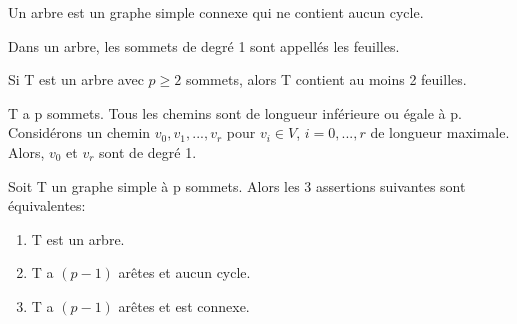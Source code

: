\begin{defn}
Un arbre est un graphe simple connexe qui ne contient aucun cycle.\\
\end{defn}

\begin{defn}
Dans un arbre, les sommets de degré 1 sont appellés les feuilles.\\
\end{defn}

\begin{exmp}
\end{exmp}



\begin{prop}
Si T est un arbre avec $p\geq2$ sommets, alors T contient au moins 2 feuilles.
\end{prop}

\begin{demo}
T a p sommets. Tous les chemins sont de longueur inférieure ou égale à p. Considérons un chemin $v_{0},v_{1},...,v_{r}$ pour $v_{i} \in V$, $i=0,...,r$ de longueur maximale. Alors, $v_{0}$ et $v_{r}$ sont de degré 1.\\
\end{demo}

\begin{thrm}
Soit T un graphe simple à p sommets. Alors les 3 assertions suivantes sont équivalentes:
	\begin{enumerate}[i]
		\item T est un arbre.
		\item T a $(p-1)$ arêtes et aucun cycle.
		\item T a $(p-1)$ arêtes et est connexe.
	\end{enumerate}
\end{thrm}

